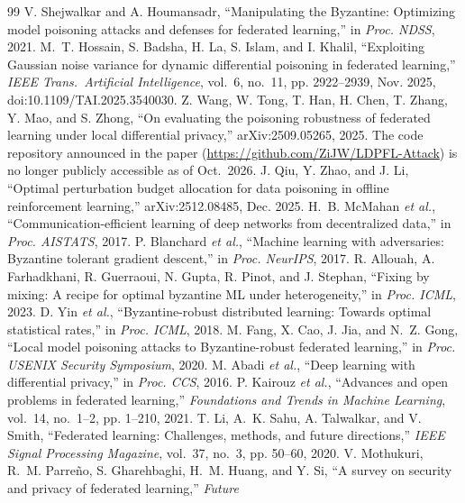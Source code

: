 \documentclass[final,1p,times]{elsarticle}
\newcommand{\etal}{\emph{et al.}}
\begin{document}
\clearpage
\begin{thebibliography}{99}
V. Shejwalkar and A. Houmansadr, ``Manipulating the Byzantine: Optimizing
model poisoning attacks and defenses for federated learning,'' in
\emph{Proc. NDSS}, 2021.
M.~T. Hossain, S. Badsha, H. La, S. Islam, and I. Khalil, ``Exploiting
Gaussian noise variance for dynamic differential poisoning in federated
learning,'' \emph{IEEE Trans.\ Artificial Intelligence}, vol.~6, no.~11,
pp. 2922--2939, Nov. 2025, doi:10.1109/TAI.2025.3540030.
Z. Wang, W. Tong, T. Han, H. Chen, T. Zhang, Y. Mao, and S. Zhong, ``On
evaluating the poisoning robustness of federated learning under local
differential privacy,'' arXiv:2509.05265, 2025. The code repository
announced in the paper (\url{https://github.com/ZiJW/LDPFL-Attack}) is
no longer publicly accessible as of Oct.\ 2026.
J. Qiu, Y. Zhao, and J. Li, ``Optimal perturbation budget allocation for
data poisoning in offline reinforcement learning,'' arXiv:2512.08485,
Dec. 2025.
H.~B. McMahan \etal, ``Communication-efficient learning of deep networks
from decentralized data,'' in \emph{Proc. AISTATS}, 2017.
P. Blanchard \etal, ``Machine learning with adversaries: Byzantine
tolerant gradient descent,'' in \emph{Proc. NeurIPS}, 2017.
R. Allouah, A. Farhadkhani, R. Guerraoui, N. Gupta, R. Pinot, and
J. Stephan, ``Fixing by mixing: A recipe for optimal byzantine ML under
heterogeneity,'' in \emph{Proc. ICML}, 2023.
D. Yin \etal, ``Byzantine-robust distributed learning: Towards optimal
statistical rates,'' in \emph{Proc. ICML}, 2018.
M. Fang, X. Cao, J. Jia, and N.~Z. Gong, ``Local model poisoning attacks
to Byzantine-robust federated learning,'' in \emph{Proc. USENIX Security
Symposium}, 2020.
M. Abadi \etal, ``Deep learning with differential privacy,'' in
\emph{Proc. CCS}, 2016.
P. Kairouz \etal, ``Advances and open problems in federated learning,''
\emph{Foundations and Trends in Machine Learning}, vol.~14, no.~1--2,
pp. 1--210, 2021.
T. Li, A.~K. Sahu, A. Talwalkar, and V. Smith, ``Federated learning:
Challenges, methods, and future directions,'' \emph{IEEE Signal
Processing Magazine}, vol.~37, no.~3, pp. 50--60, 2020.
V. Mothukuri, R.~M. Parre\~no, S. Gharehbaghi, H.~M. Huang, and Y. Si,
``A survey on security and privacy of federated learning,'' \emph{Future
}
\end{thebibliography}
\end{document}
